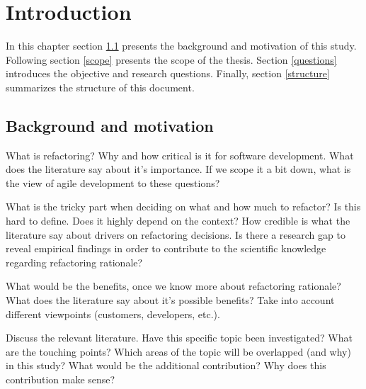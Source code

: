 \documentclass[english,12pt,a4paper,pdftex,sci,utf8]{aaltothesis}
\begin{document}
\newpage


\thesistableofcontents

\newpage

\printglossaries

\newpage

\listoftables


\cleardoublepage
\storeinipagenumber
{}
\setcounter{page}{1}


\section{Introduction} \label{introduction}
In this chapter section \ref{background} presents the background and motivation of this study. Following section \ref{scope} presents the scope of the thesis. Section \ref{questions} introduces the objective and research questions. Finally, section \ref{structure} summarizes the structure of this document. 
\subsection{Background and motivation} \label{background}
What is refactoring? Why and how critical is it for software development. What does the literature say about it's importance. If we scope it a bit down, what is the view of agile development to these questions?

What is the tricky part when deciding on what and how much to refactor? Is this hard to define. Does it highly depend on the context? How credible is what the literature say about drivers on refactoring decisions. Is there a research gap to reveal empirical findings in order to contribute to the scientific knowledge regarding refactoring rationale?

What would be the benefits, once we know more about refactoring rationale? What does the literature say about it's possible benefits? Take into account different viewpoints (customers, developers, etc.).

Discuss the relevant literature. Have this specific topic been investigated? What are the touching points? Which areas of the topic will be overlapped (and why) in this study? What would be the additional contribution? Why does this contribution make sense?
\end{document}
